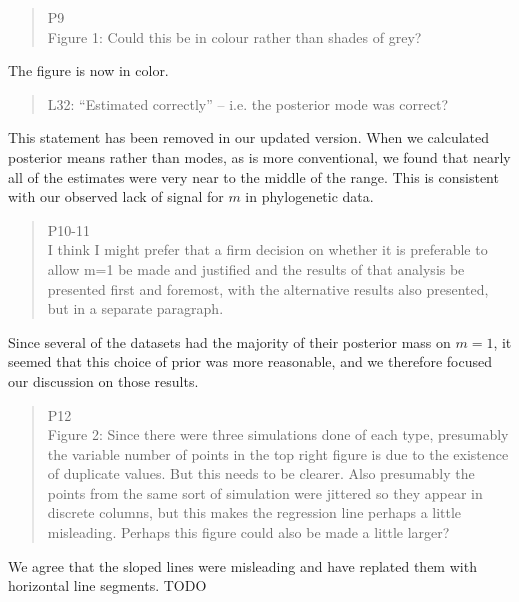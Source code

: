 \documentclass[12pt]{letter}
\begin{document}
\begin{letter}{ }
\begin{quote}
  \itshape

  P9 \\
  Figure 1: Could this be in colour rather than shades of grey?
\end{quote}

The figure is now in color.

\begin{quote}
  \itshape

  L32: “Estimated correctly” – i.e. the posterior mode was correct?
\end{quote}

This statement has been removed in our updated version. When we calculated
posterior means rather than modes, as is more conventional, we found that
nearly all of the estimates were very near to the middle of the range. This is
consistent with our observed lack of signal for $m$ in phylogenetic data.

\begin{quote}
  \itshape

  P10-11 \\
  I think I might prefer that a firm decision on whether it is preferable to
  allow m=1 be made and justified and the results of that analysis be presented
  first and foremost, with the alternative results also presented, but in a
  separate paragraph.
\end{quote}

Since several of the datasets had the majority of their posterior mass on $m =
1$, it seemed that this choice of prior was more reasonable, and we therefore
focused our discussion on those results. 

\begin{quote}
  \itshape

  P12 \\
  Figure 2: Since there were three simulations done of each type, presumably
  the variable number of points in the top right figure is due to the existence
  of duplicate values. But this needs to be clearer. Also presumably the points
  from the same sort of simulation were jittered so they appear in discrete
  columns, but this makes the regression line perhaps a little misleading.
  Perhaps this figure could also be made a little larger?
\end{quote}

We agree that the sloped lines were misleading and have replated them with
horizontal line segments. TODO

\begin{quote}
  \itshape


\end{quote}
\end{letter}
\end{document}
